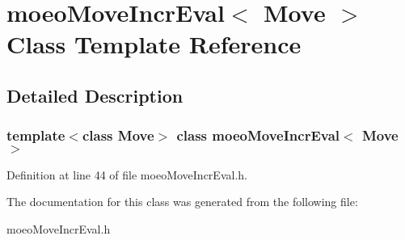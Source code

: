 \section{moeo\-Move\-Incr\-Eval$<$ Move $>$ Class Template Reference}
\label{classmoeoMoveIncrEval}


\subsection{Detailed Description}
\subsubsection*{template$<$class Move$>$ class moeo\-Move\-Incr\-Eval$<$ Move $>$}





Definition at line 44 of file moeo\-Move\-Incr\-Eval.h.

The documentation for this class was generated from the following file:\begin{CompactItemize}
\item 
moeo\-Move\-Incr\-Eval.h\end{CompactItemize}
